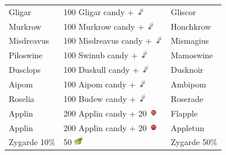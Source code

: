 \begin{table}
\begin{tabular}{lll}
    Gligar & 100 Gligar candy + \includegraphics[width=1em,height=1em]{images/sinnohstone.png} & Gliscor	\\
    Murkrow & 100 Murkrow candy + \includegraphics[width=1em,height=1em]{images/sinnohstone.png} & Honchkrow	\\
    Misdreavus & 100 Misdreavus candy + \includegraphics[width=1em,height=1em]{images/sinnohstone.png} & Mismagius	\\
    Piloswine & 100 Swinub candy + \includegraphics[width=1em,height=1em]{images/sinnohstone.png} & Mamoswine	\\
    Dusclops & 100 Duskull candy + \includegraphics[width=1em,height=1em]{images/sinnohstone.png} & Dusknoir	\\
    Aipom & 100 Aipom candy + \includegraphics[width=1em,height=1em]{images/sinnohstone.png} & Ambipom	\\
    Roselia & 100 Budew candy + \includegraphics[width=1em,height=1em]{images/sinnohstone.png} & Roserade	\\
    Applin & 200 Applin candy + 20 \includegraphics[width=1em,height=1em]{images/tartapple.png} & Flapple \\
    Applin & 200 Applin candy + 20 \includegraphics[width=1em,height=1em]{images/sweetapple.png} & Appletun \\
    Zygarde 10\% & 50 \includegraphics[width=1em,height=1em]{images/zygardecell.png} & Zygarde 50\% \\

\end{tabular}
\end{table}

